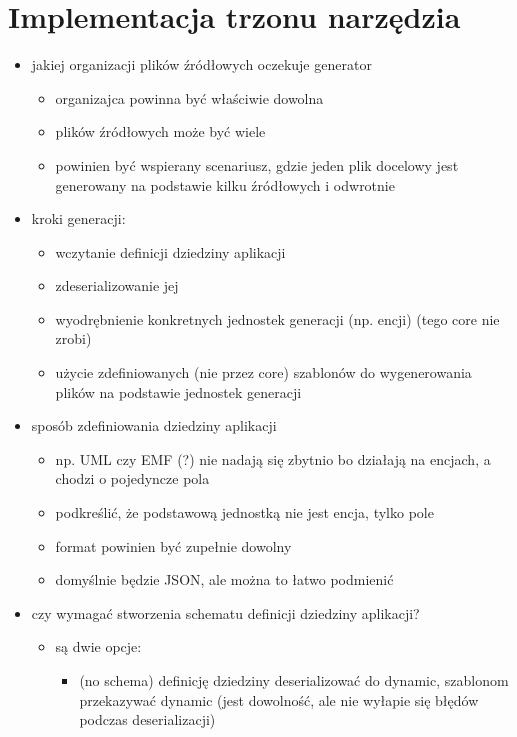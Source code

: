 \chapter{Implementacja trzonu narzędzia} \label{chap:implementation:core}

\begin{itemize}
 \item jakiej organizacji plików źródłowych oczekuje generator
  \begin{itemize}
   \item organizajca powinna być właściwie dowolna
   \item plików źródłowych może być wiele
   \item powinien być wspierany scenariusz, gdzie jeden plik docelowy jest generowany na podstawie kilku źródłowych i odwrotnie
  \end{itemize}
 \item kroki generacji:
  \begin{itemize}
   \item wczytanie definicji dziedziny aplikacji
   \item zdeserializowanie jej
   \item wyodrębnienie konkretnych jednostek generacji (np. encji) (tego core nie zrobi)
   \item użycie zdefiniowanych (nie przez core) szablonów do wygenerowania plików na podstawie jednostek generacji
  \end{itemize}
 \item sposób zdefiniowania dziedziny aplikacji
  \begin{itemize}
   \item np. UML czy EMF (?) nie nadają się zbytnio bo działają na encjach, a chodzi o pojedyncze pola
   \item podkreślić, że podstawową jednostką nie jest encja, tylko pole
   \item format powinien być zupełnie dowolny
   \item domyślnie będzie JSON, ale można to łatwo podmienić
  \end{itemize}
 \item czy wymagać stworzenia schematu definicji dziedziny aplikacji?
  \begin{itemize}
   \item są dwie opcje:
    \begin{itemize}
     \item (no schema) definicję dziedziny deserializować do dynamic, szablonom przekazywać dynamic (jest dowolność, ale nie wyłapie się błędów podczas deserializacji)

\end{itemize}
\end{itemize}
\end{itemize}
